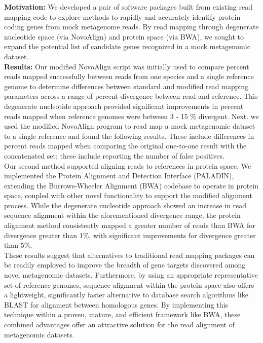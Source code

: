 \textbf{Motivation:} We developed a pair of software packages built from existing read mapping code to explore methods to rapidly and accurately identify protein coding genes from mock metagenome reads. By read mapping through degenerate nucleotide space (via NovoAlign) and protein space (via BWA), we sought to expand the potential list of candidate genes recognized in a mock metagenomic dataset.\\
\textbf{Results:} Our modified NovoAlign script was initially used to compare percent reads mapped successfully between reads from one species and a single reference genome to determine differences between standard and modified read mapping parameters across a range of percent divergence between read and reference. This degenerate nucleotide approach provided significant improvements in percent reads mapped when reference genomes were between 3 - 15 \% divergent. Next. we used the modified NovoAlign program to read map a mock metagenomic dataset to a single reference and found the following results. These include differences in percent reads mapped when comparing the original one-to-one result with the concatenated set; these include reporting the number of false positives. \\

Our second method supported aligning reads to references in protein space.  We implemented the Protein Alignment and Detection Interface (PALADIN), extending the Burrows-Wheeler Alignment (BWA) codebase to operate in protein space, coupled with other novel functionality to support the modified alignment process.  While  the degenerate nucleotide approach showed an increase in read sequence alignment within the aforementioned divergence range, the protein alignment method consistently mapped a greater number of reads than BWA for divergence greater than 1\%, with significant improvements for divergence greater than 5\%.  \\

These results suggest that alternatives to traditional read mapping packages can be readily employed to improve the breadth of gene targets discovered among novel metagenomic datasets. Furthermore, by using an appropriate representative set of reference genomes, sequence alignment within the protein space also offers a lightweight, significantly faster alternative to database search algorithms like BLAST for alignment between homologous genes.  By implementing this technique within a proven, mature, and efficient framework like BWA, these combined advantages offer an attractive solution for the read alignment of metagenomic datasets.
